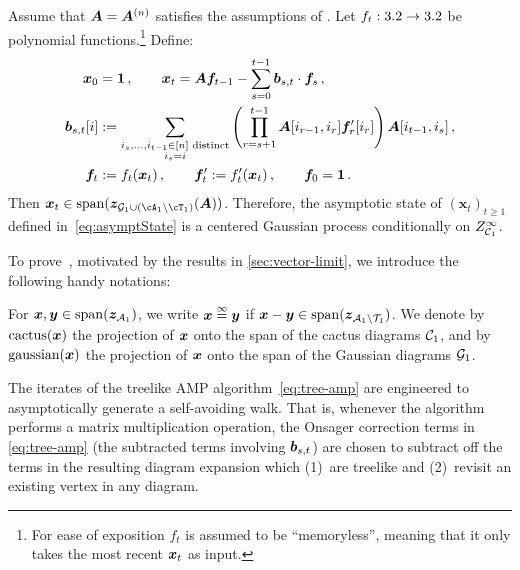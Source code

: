 \begin{theorem}
\label{thm:full-onsager}
Assume that ${\bm A}={\bm A}^{(n)}$ satisfies the assumptions of . 
Let $f_t : 3.2 \to 3.2$ be polynomial functions.\footnote{For ease of exposition $f_t$ is assumed to be ``memoryless'', meaning that it only takes the most recent ${\bm x}_{t}$ as input.} Define:
\begin{equation}
    \begin{aligned}
    {\bm x}_0 &= \bm{1}\,,\qquad 
    {\bm x}_t = {\bm A} {\bm f}_{t-1}
      - \sum_{s=0}^{t-1} {\bm b}_{s,t} \cdot {\bm f}_s\,,\\
    {\bm b}_{s,t}[i]
    &:= \sum_{\substack{i_s,\ldots,i_{t-1}\in[n] \textnormal{ distinct}\\i_s=i}} \left(\prod_{r=s+1}^{t-1} \bm A[i_{r-1}, i_{r}] \bm f'_{r}[i_{r}] \right){\bm A}[i_{t-1},i_s]\,,\\
    {\bm f}_t &:= f_t({\bm x}_t)\,, \qquad
    {\bm f}'_t := f'_t({\bm x}_t)\,,\qquad \bm f_0 = \bm 1\,.\label{eq:tree-amp}
    \end{aligned}
\end{equation}
Then $\bx_t \in \linspan(\bmz_{\cG_1 \cup (\cA_1 \setminus \cT_1)}(\bA))$. Therefore, the asymptotic state of $(\bm x_t)_{t\ge 1}$ defined
in~\cref{eq:asymptState}
is a centered Gaussian process conditionally on $Z^\infty_{{\cal C}_1}$.
\end{theorem}

\noindent To prove~, motivated by the results in \cref{sec:vector-limit}, we introduce
the following handy notations:
\newcommand\gauss{\textnormal{gaussian}}

\begin{definition}\label{def:eqinf}
    For $\bm x,\bm y\in \operatorname{span}({\bm z}_{{\cal A}_1})$, we write $\bm x \overset{\infty}{=} \bm y$ if $\bm x - \bm y\in \operatorname{span}({\bm z}_{{\cal A}_1\setminus {\cal T}_1})$.
    We denote by $\operatorname{cactus}({\bm x})$ the
    projection of ${\bm x}$ onto the span
    of the cactus diagrams ${\cal C}_1$,
    and by $\gauss(\bmx)$ the
    projection of ${\bm x}$ onto the span
    of the Gaussian diagrams ${\cal G}_1$.
\end{definition}


The iterates of the treelike AMP
algorithm~\cref{eq:tree-amp} are engineered to 
asymptotically generate a self-avoiding walk.
That is, whenever the algorithm performs a matrix multiplication operation,
the Onsager correction terms in \cref{eq:tree-amp} (the subtracted terms involving ${\bm b}_{s,t}$) are chosen to subtract
off the terms in the resulting diagram expansion which (1)~are treelike and (2)~revisit an existing vertex in any diagram.

